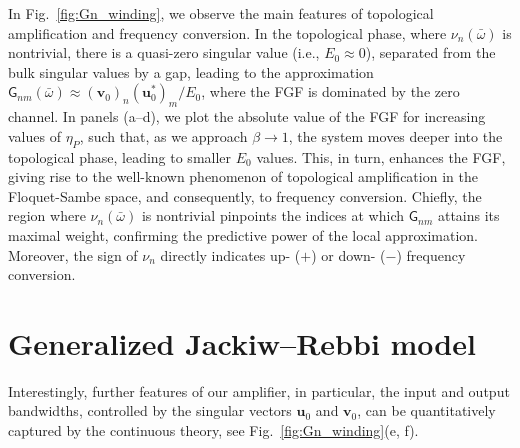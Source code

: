 \documentclass[a4paper,twocolumn,floatfix,10pt,superscriptaddress]%
{quantumarticle}
\newcommand{\dptc}[1]{{\color{dptcolor}{[D: #1]}}}
\newcommand{\msf}[1]{\mathsf{#1}}
\newcommand{\bsb}[1]{\boldsymbol{#1}}
\newcommand{\msG}{{\msf{G}}}
\newcommand{\bu}{{\bsb{u}}}
\newcommand{\bv}{{\bsb{v}}}
\begin{document}
In Fig.~\ref{fig:Gn_winding}, we observe the main features of topological amplification and frequency conversion. In the topological phase, where $\nu_n(\bar\omega)$ is nontrivial, there is a quasi-zero singular value (i.e., $E_0\approx0$), separated from the bulk singular values by a gap, leading to the approximation $\msG_{nm}(\bar\omega)\approx (\bsb{v}_0)_n (\bsb{u}_0^*)_m/E_0$, where the FGF is dominated by the zero channel. In panels (a–d), we plot the absolute value of the FGF for increasing values of $\eta_P$, such that, as we approach $\beta\rightarrow 1$, the system moves deeper into the topological phase, leading to smaller $E_0$ values. This, in turn, enhances the FGF, giving rise to the well-known phenomenon of topological amplification in the Floquet-Sambe space, and consequently, to frequency conversion. Chiefly, the region where $\nu_n(\bar\omega)$ is nontrivial pinpoints the indices at which $\msG_{nm}$ attains its maximal weight, confirming the predictive power of the local approximation. Moreover, the sign of $\nu_n$ directly indicates up- ($+$) or down- ($-$) frequency conversion.
\section{Generalized Jackiw--Rebbi model}\label{sec::4}
Interestingly, further features of our amplifier, in particular, the input and output bandwidths, controlled by the singular vectors $\bu_0$ and $\bv_0$, can be quantitatively captured by the continuous \dptc{Jackiw-Rebbi}  theory, see Fig.~\ref{fig:Gn_winding}(e, f). 
\end{document}
